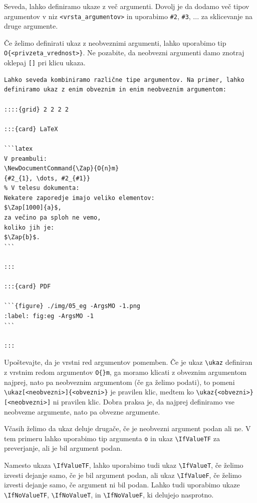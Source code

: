 Seveda, lahko definiramo ukaze z več argumenti. Dovolj je da dodamo več tipov argumentov v niz \texttt{\textless vrsta\_argumentov\textgreater } in uporabimo \texttt{\#2}, \texttt{\#3}, ... za sklicevanje na druge argumente.

Če želimo definirati ukaz z neobveznimi argumenti, lahko uporabimo tip \texttt{O\{\textless privzeta\_vrednost\textgreater \}}. Ne pozabite, da neobvezni argumenti damo znotraj oklepaj \texttt{[]} pri klicu ukaza.

\begin{verbatim}
Lahko seveda kombiniramo različne tipe argumentov. Na primer, lahko definiramo ukaz z enim obveznim in enim neobveznim argumentom:

::::{grid} 2 2 2 2

:::{card} LaTeX

```latex
V preambuli:
\NewDocumentCommand{\Zap}{O{n}m}
{#2_{1}, \dots, #2_{#1}}
% V telesu dokumenta:
Nekatere zaporedje imajo veliko elementov:
$\Zap[1000]{a}$,
za večino pa sploh ne vemo,
koliko jih je:
$\Zap{b}$.
```

:::

:::{card} PDF

```{figure} ./img/05_eg -ArgsMO -1.png
:label: fig:eg -ArgsMO -1
```

:::
\end{verbatim}

Upoštevajte, da je vrstni red argumentov pomemben. Če je ukaz \texttt{{\textbackslash}ukaz} definiran z vrstnim redom argumentov \texttt{O\{\}m}, ga moramo klicati z obveznim argumentom najprej, nato pa neobveznim argumentom (če ga želimo podati), to pomeni \texttt{{\textbackslash}ukaz[\textless neobvezni\textgreater ]\{\textless obvezni\textgreater \}} je pravilen klic, medtem ko \texttt{{\textbackslash}ukaz\{\textless obvezni\textgreater \}[\textless neobvezni\textgreater ]} ni pravilen klic.
Dobra praksa je, da najprej definiramo vse neobvezne argumente, nato pa obvezne argumente.

Včasih želimo da ukaz deluje drugače, če je neobvezni argument podan ali ne. V tem primeru lahko uporabimo tip argumenta \texttt{o} in ukaz \texttt{{\textbackslash}IfValueTF} za preverjanje, ali je bil argument podan.

Namesto ukaza \texttt{{\textbackslash}IfValueTF}, lahko uporabimo tudi ukaz \texttt{{\textbackslash}IfValueT}, če želimo izvesti dejanje samo, če je bil argument podan, ali ukaz \texttt{{\textbackslash}IfValueF}, če želimo izvesti dejanje samo, če argument ni bil podan. Lahko tudi uporabimo ukaze \texttt{{\textbackslash}IfNoValueTF}, \texttt{{\textbackslash}IfNoValueT}, in \texttt{{\textbackslash}IfNoValueF}, ki delujejo nasprotno.

